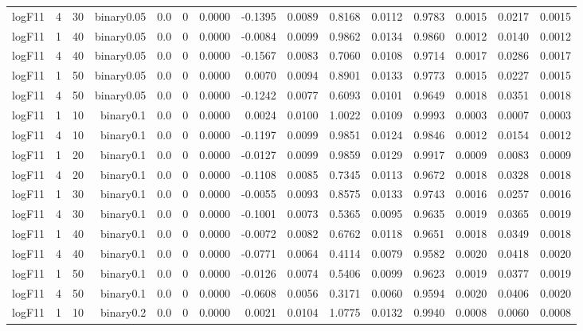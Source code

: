 \begin{longtable}{rrrrrrrrrrrrrrr}
  logF11 & 4 & 30 & binary0.05 & 0.0 & 0 & 0.0000 & -0.1395 & 0.0089 & 0.8168 & 0.0112 & 0.9783 & 0.0015 & 0.0217 & 0.0015 \\ 
  logF11 & 1 & 40 & binary0.05 & 0.0 & 0 & 0.0000 & -0.0084 & 0.0099 & 0.9862 & 0.0134 & 0.9860 & 0.0012 & 0.0140 & 0.0012 \\ 
  logF11 & 4 & 40 & binary0.05 & 0.0 & 0 & 0.0000 & -0.1567 & 0.0083 & 0.7060 & 0.0108 & 0.9714 & 0.0017 & 0.0286 & 0.0017 \\ 
  logF11 & 1 & 50 & binary0.05 & 0.0 & 0 & 0.0000 & 0.0070 & 0.0094 & 0.8901 & 0.0133 & 0.9773 & 0.0015 & 0.0227 & 0.0015 \\ 
  logF11 & 4 & 50 & binary0.05 & 0.0 & 0 & 0.0000 & -0.1242 & 0.0077 & 0.6093 & 0.0101 & 0.9649 & 0.0018 & 0.0351 & 0.0018 \\ 
  logF11 & 1 & 10 & binary0.1 & 0.0 & 0 & 0.0000 & 0.0024 & 0.0100 & 1.0022 & 0.0109 & 0.9993 & 0.0003 & 0.0007 & 0.0003 \\ 
  logF11 & 4 & 10 & binary0.1 & 0.0 & 0 & 0.0000 & -0.1197 & 0.0099 & 0.9851 & 0.0124 & 0.9846 & 0.0012 & 0.0154 & 0.0012 \\ 
  logF11 & 1 & 20 & binary0.1 & 0.0 & 0 & 0.0000 & -0.0127 & 0.0099 & 0.9859 & 0.0129 & 0.9917 & 0.0009 & 0.0083 & 0.0009 \\ 
  logF11 & 4 & 20 & binary0.1 & 0.0 & 0 & 0.0000 & -0.1108 & 0.0085 & 0.7345 & 0.0113 & 0.9672 & 0.0018 & 0.0328 & 0.0018 \\ 
  logF11 & 1 & 30 & binary0.1 & 0.0 & 0 & 0.0000 & -0.0055 & 0.0093 & 0.8575 & 0.0133 & 0.9743 & 0.0016 & 0.0257 & 0.0016 \\ 
  logF11 & 4 & 30 & binary0.1 & 0.0 & 0 & 0.0000 & -0.1001 & 0.0073 & 0.5365 & 0.0095 & 0.9635 & 0.0019 & 0.0365 & 0.0019 \\ 
  logF11 & 1 & 40 & binary0.1 & 0.0 & 0 & 0.0000 & -0.0072 & 0.0082 & 0.6762 & 0.0118 & 0.9651 & 0.0018 & 0.0349 & 0.0018 \\ 
  logF11 & 4 & 40 & binary0.1 & 0.0 & 0 & 0.0000 & -0.0771 & 0.0064 & 0.4114 & 0.0079 & 0.9582 & 0.0020 & 0.0418 & 0.0020 \\ 
  logF11 & 1 & 50 & binary0.1 & 0.0 & 0 & 0.0000 & -0.0126 & 0.0074 & 0.5406 & 0.0099 & 0.9623 & 0.0019 & 0.0377 & 0.0019 \\ 
  logF11 & 4 & 50 & binary0.1 & 0.0 & 0 & 0.0000 & -0.0608 & 0.0056 & 0.3171 & 0.0060 & 0.9594 & 0.0020 & 0.0406 & 0.0020 \\ 
  logF11 & 1 & 10 & binary0.2 & 0.0 & 0 & 0.0000 & 0.0021 & 0.0104 & 1.0775 & 0.0132 & 0.9940 & 0.0008 & 0.0060 & 0.0008 \\ 

\end{longtable}
